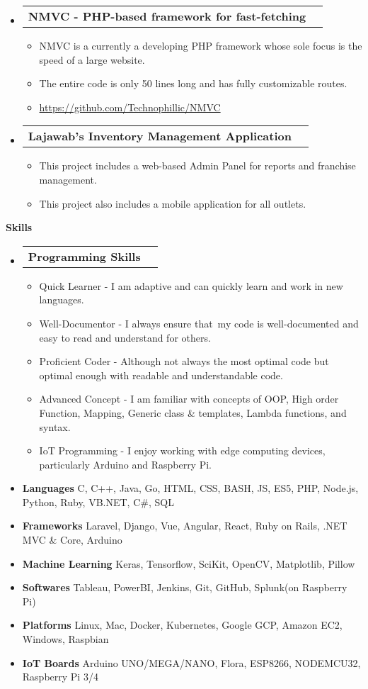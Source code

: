 \documentclass[letterpaper,12pt]{article}[leftmargin=*]
\makeatletter
\def \entryspacing {-0pt}
\renewcommand{\section}[2]{\vspace{5pt}
  \colorbox{secondary}{\color{white}\raggedbottom\normalsize\textbf{{#1}{\hspace{7pt}#2}}}
}
\newcommand{\resumeEntryStart}{\begin{itemize}[leftmargin=2.5mm]}
\newcommand{\resumeEntryEnd}{\end{itemize}\vspace{\entryspacing}}
\newcommand{\resumeItemListStart}{\begin{itemize}[leftmargin=4.5mm]}
\newcommand{\resumeItemListEnd}{\end{itemize}}
\newcommand{\resumeItem}[1]{
  \item\small{
    {#1 \vspace{-2pt}}
  }
}
\newcommand{\resumeEntryTD}[2]{
  \vspace{-1pt}\item[]
    \begin{tabularx}{0.97\textwidth}{X@{\hspace{60pt}}r}
      \textbf{\color{primary}#1} & {\firabook\color{accent}\small#2} \\
    \end{tabularx}\vspace{-6pt}
}
\newcommand{\resumeEntryS}[2]{
  \item[]\small{
    \textbf{\color{primary}#1 }{ #2 \vspace{-6pt}}
  }
}
\makeatother
\begin{document}
\resumeEntryStart
    \resumeEntryTD
      {NMVC - PHP-based framework for fast-fetching}{}
    \resumeItemListStart
      \resumeItem {NMVC is a currently a developing PHP framework whose sole focus is the speed of a large website.}
      \resumeItem {The entire code is only 50 lines long and has fully customizable routes.}
      \resumeItem {\url{https://github.com/Technophillic/NMVC}}
    \resumeItemListEnd
  \resumeEntryEnd

  \resumeEntryStart
    \resumeEntryTD
      {Lajawab's Inventory Management Application}{}
    \resumeItemListStart
      \resumeItem {This project includes a web-based Admin Panel for reports and franchise management.}
      \resumeItem {This project also includes a mobile application for all outlets.}
    \resumeItemListEnd
  \resumeEntryEnd


\section{\faGears}{Skills}
      \resumeEntryStart
        \resumeEntryTD
          {Programming Skills}{}
        \resumeItemListStart
          \resumeItem {Quick Learner - I am adaptive and can quickly learn and work in new languages.}
          \resumeItem {Well-Documentor - I always ensure that my code is well-documented and easy to read \linebreak and understand for others.}
          \resumeItem {Proficient Coder - Although not always the most optimal code but optimal enough with \linebreak readable and understandable code.}
          \resumeItem {Advanced Concept - I am familiar with concepts of OOP, High order Function, Mapping,\linebreak
           Generic class \& templates, Lambda functions, and syntax.}
          \resumeItem {IoT Programming - I enjoy working with edge computing devices, particularly Arduino \linebreak and Raspberry Pi.}
          \resumeItemListEnd
        \resumeEntryS{Languages} { C, C++, Java, Go, HTML, CSS, BASH, JS, ES5, PHP, Node.js, Python, Ruby, VB.NET, C\#, SQL}
        \resumeEntryS{Frameworks} {Laravel, Django, Vue, Angular, React, Ruby on Rails, .NET MVC \& Core, Arduino}
        \resumeEntryS{Machine Learning} {Keras, Tensorflow, SciKit, OpenCV, Matplotlib, Pillow}
        \resumeEntryS{Softwares} {Tableau, PowerBI, Jenkins, Git, GitHub, Splunk(on Raspberry Pi)}
        \resumeEntryS{Platforms} {Linux, Mac, Docker, Kubernetes, Google GCP, Amazon EC2, Windows, Raspbian}
        \resumeEntryS{IoT Boards} {Arduino UNO/MEGA/NANO, Flora, ESP8266, NODEMCU32, Raspberry Pi 3/4}
      
      \begin{flushright}
      \end{flushright}
  \resumeEntryEnd    
  
\end{document}
